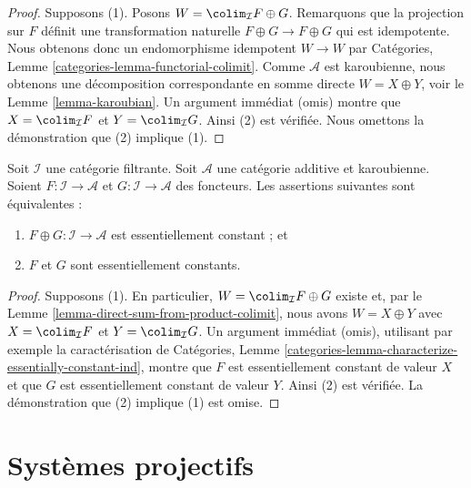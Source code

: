\begin{proof}
Supposons (1). Posons $W = \colim_\mathcal{I} F \oplus G$.
Remarquons que la projection sur $F$ définit une transformation naturelle
$F \oplus G \to F \oplus G$ qui est idempotente. Nous obtenons donc
un endomorphisme idempotent $W \to W$ par
Catégories, Lemme \ref{categories-lemma-functorial-colimit}.
Comme $\mathcal{A}$ est karoubienne, nous obtenons une décomposition
correspondante en somme directe $W = X \oplus Y$, voir le
Lemme \ref{lemma-karoubian}.
Un argument immédiat (omis) montre que
$X = \colim_\mathcal{I} F$ et $Y = \colim_\mathcal{I} G$.
Ainsi (2) est vérifiée. Nous omettons la démonstration que (2) implique (1).
\end{proof}

\begin{lemma}
\label{lemma-direct-sum-from-product-essentially-constant}
Soit $\mathcal{I}$ une catégorie filtrante. Soit $\mathcal{A}$
une catégorie additive et karoubienne. Soient
$F : \mathcal{I} \to \mathcal{A}$ et
$G : \mathcal{I} \to \mathcal{A}$ des foncteurs. Les assertions suivantes
sont équivalentes :
\begin{enumerate}
\item $F \oplus G : \mathcal{I} \to \mathcal{A}$
est essentiellement constant ; et
\item $F$ et $G$ sont essentiellement constants.
\end{enumerate}
\end{lemma}

\begin{proof}
Supposons (1). En particulier,
$W = \colim_\mathcal{I} F \oplus G$ existe et, par le
Lemme \ref{lemma-direct-sum-from-product-colimit},
nous avons $W = X \oplus Y$ avec $X = \colim_\mathcal{I} F$ et
$Y = \colim_\mathcal{I} G$. Un argument immédiat (omis), utilisant par
exemple la caractérisation de
Catégories, Lemme \ref{categories-lemma-characterize-essentially-constant-ind},
montre que $F$ est essentiellement constant de valeur $X$ et que $G$ est
essentiellement constant de valeur $Y$. Ainsi (2) est vérifiée.
La démonstration que (2) implique (1) est omise.
\end{proof}

\section{Systèmes projectifs}
\label{section-inverse-systems}

